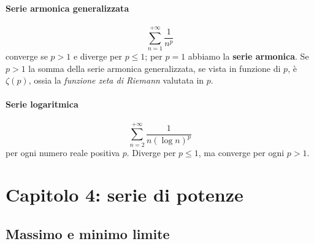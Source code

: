 \paragraph{Serie armonica generalizzata}
	\begin{equation}
		\sum_{n=1}^{+\infty}\frac{1}{n^p}
	\end{equation}
	converge se $p>1$ e diverge per $p\leq 1$; per $p=1$ abbiamo la \textbf{serie armonica}. Se $p>1$ la somma della serie armonica generalizzata, se vista in funzione di $p$, è  $\zeta\left(p\right)$, ossia la \textit{funzione zeta di Riemann} valutata in $p$.
\paragraph{Serie logaritmica}
	\begin{equation}
		\sum_{n=2}^{+\infty}\frac{1}{n\left(\log n\right)^p}
	\end{equation}
	per ogni numero reale positiva $p$. Diverge per $p\leq 1$, ma converge per ogni $p>1$.
\section{Capitolo 4: serie di potenze}
\subsection{Massimo e minimo limite}\label{maxminlimite}
